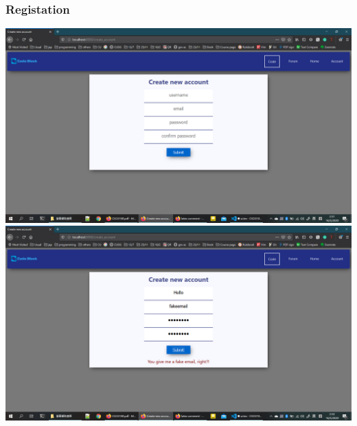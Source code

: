 \subsubsection{Registation}
\includegraphics[scale=0.45]{Doc/Pics/create_account_no_msg.png}
\includegraphics[scale=0.45]{Doc/Pics/create_account_msg.png}

